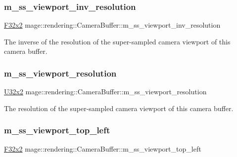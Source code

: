 \subsubsection{\texorpdfstring{m\+\_\+ss\+\_\+viewport\+\_\+inv\+\_\+resolution}{m\_ss\_viewport\_inv\_resolution}}
{\footnotesize\ttfamily \mbox{\hyperlink{namespacemage_a9dc0d34d6ecc87e4cfa4a826102117bc}{F32x2}} mage\+::rendering\+::\+Camera\+Buffer\+::m\+\_\+ss\+\_\+viewport\+\_\+inv\+\_\+resolution}

The inverse of the resolution of the super-\/sampled camera viewport of this camera buffer. \mbox{\label{structmage_1_1rendering_1_1_camera_buffer_a96b17352187228ee2265be33d3f2d159}} 
\subsubsection{\texorpdfstring{m\+\_\+ss\+\_\+viewport\+\_\+resolution}{m\_ss\_viewport\_resolution}}
{\footnotesize\ttfamily \mbox{\hyperlink{namespacemage_a31f2bb52b5080e706e1c13de07c0a249}{U32x2}} mage\+::rendering\+::\+Camera\+Buffer\+::m\+\_\+ss\+\_\+viewport\+\_\+resolution}

The resolution of the super-\/sampled camera viewport of this camera buffer. \mbox{\label{structmage_1_1rendering_1_1_camera_buffer_a7410f2408daa4e4a69e145eb8d31a2d7}} 
\subsubsection{\texorpdfstring{m\+\_\+ss\+\_\+viewport\+\_\+top\+\_\+left}{m\_ss\_viewport\_top\_left}}
{\footnotesize\ttfamily \mbox{\hyperlink{namespacemage_a9dc0d34d6ecc87e4cfa4a826102117bc}{F32x2}} mage\+::rendering\+::\+Camera\+Buffer\+::m\+\_\+ss\+\_\+viewport\+\_\+top\+\_\+left}

